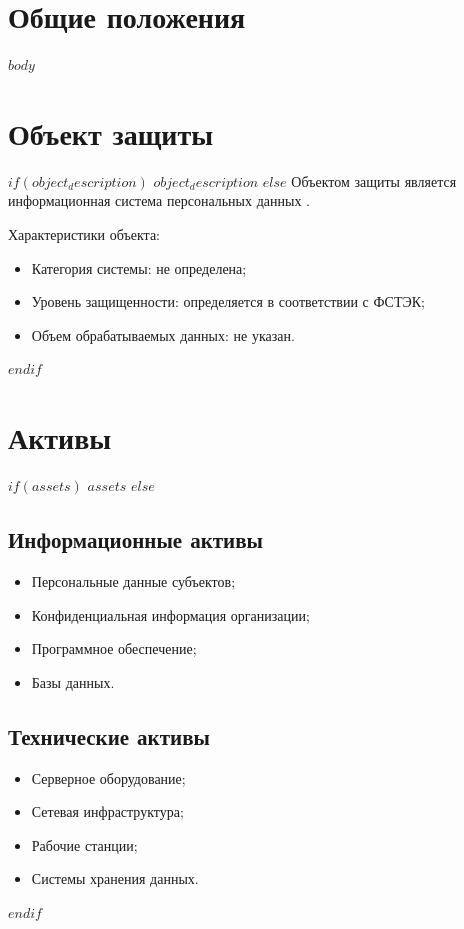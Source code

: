 \documentclass[14pt,a4paper]{extarticle}
\begin{document}
\makeTitlePage

\mainpagestyle
\tableofcontents
\newpage

\section{Общие положения}
\label{sec:general}

$body$

\section{Объект защиты}
\label{sec:object}

$if(object_description)$
$object_description$
$else$
Объектом защиты является информационная система персональных данных \docOrganization.

Характеристики объекта:
\begin{itemize}
    \item Категория системы: \ifx\docCategory\undefined не определена\else \docCategory\fi;
    \item Уровень защищенности: определяется в соответствии с ФСТЭК;
    \item Объем обрабатываемых данных: \ifx\docVolume\undefined не указан\else \docVolume\fi.
\end{itemize}
$endif$

\section{Активы}
\label{sec:assets}

$if(assets)$
$assets$
$else$
\subsection{Информационные активы}
\begin{itemize}
    \item Персональные данные субъектов;
    \item Конфиденциальная информация организации;
    \item Программное обеспечение;
    \item Базы данных.
\end{itemize}

\subsection{Технические активы}
\begin{itemize}
    \item Серверное оборудование;
    \item Сетевая инфраструктура;
    \item Рабочие станции;
    \item Системы хранения данных.
\end{itemize}
$endif$
\end{document}
